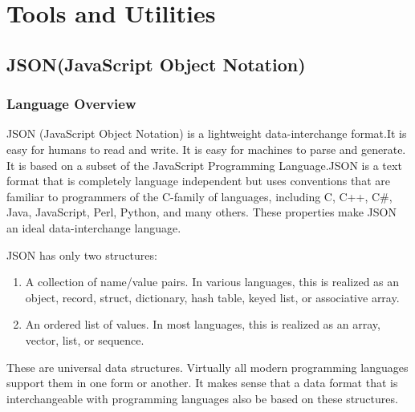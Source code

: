 
\chapter{Tools and Utilities} %

\label{Chapter4} %



\section{JSON(JavaScript Object Notation)}
\subsection{Language Overview}
JSON \cite{JSON-standard} (JavaScript Object Notation) is a lightweight data-interchange format.It is easy for humans to read and write. It is easy for machines to parse and generate. It is based on a subset of the JavaScript Programming Language.JSON is a text format that is completely language independent but uses conventions that are familiar to programmers of the C-family of languages, including C, C++, C\#, Java, JavaScript, Perl, Python, and many others. These properties make JSON an ideal data-interchange language.

JSON has only two structures:
\begin{enumerate}
\item A collection of name/value pairs. In various languages, this is realized as an object, record, struct, dictionary, hash table, keyed list, or associative array.
\item An ordered list of values. In most languages, this is realized as an array, vector, list, or sequence.
\end{enumerate}
These are universal data structures. Virtually all modern programming languages support them in one form or another. It makes sense that a data format that is interchangeable with programming languages also be based on these structures.

